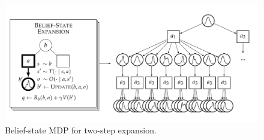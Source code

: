 \begin{figure}[b!]
    \centering
    \includegraphics[width=\linewidth]{diagrams/bbmdp/bmdp.pdf}
    \caption{Belief-state MDP for two-step expansion.}
    \label{fig:bmdp_expansion}
\end{figure}


